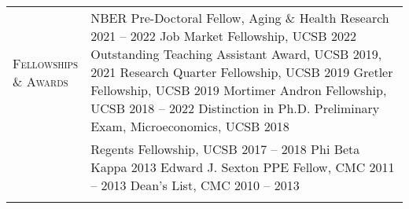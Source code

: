 \documentclass[11pt]{article}
\newcommand{\xspace}{19pt}
\begin{document}
\begin{tabularx}{\textwidth}{@{}Y Z@{}}
	\textsc{Fellowships \newline \& Awards} & 
	NBER Pre-Doctoral Fellow, Aging \& Health Research \hfill 2021 -- 2022%
	\vspace{3pt} \newline
	Job Market Fellowship, UCSB \hfill 2022%
	\vspace{3pt} \newline
	Outstanding Teaching Assistant Award, UCSB \hfill 2019, 2021%
	\vspace{3pt} \newline
	Research Quarter Fellowship, UCSB \hfill 2019%
	\vspace{3pt} \newline
	Gretler Fellowship, UCSB \hfill 2019%
	\vspace{3pt} \newline 
	Mortimer Andron Fellowship, UCSB \hfill 2018 -- 2022%
	\vspace{3pt} \newline 
	Distinction in Ph.D. Preliminary Exam, Microeconomics, UCSB \hfill 2018%
		\\ \newpage & %
	Regents Fellowship, UCSB \hfill 2017 -- 2018%
	\vspace{3pt} \newline
	Phi Beta Kappa \hfill 2013%
	\vspace{3pt} \newline
	Edward J. Sexton PPE Fellow, CMC \hfill 2011 -- 2013%
	\vspace{3pt} \newline
	Dean's List, CMC \hfill 2010 -- 2013%
	 \\ \addlinespace[\xspace]  


\end{tabularx}
\end{document}
